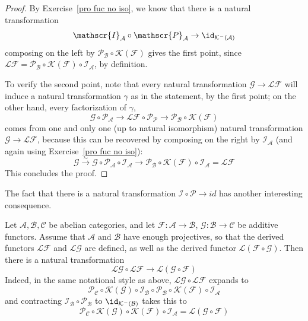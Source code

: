 \begin{proof}
By Exercise~\ref{pro fuc no iso}, we know that there is a natural transformation
\[\mathscr{I}_{\mathcal{A}}\circ\mathscr{P}_{\mathcal{A}}\to \id_{\mathcal{K}^-(\mathcal{A})}\]
composing on the left by $\mathscr{P}_{\mathcal{B}}\circ\mathcal{K}(\mathscr{F})$ gives the first point, since $\mathcal{L}\mathscr{F}=\mathscr{P}_{\mathcal{B}}\circ\mathcal{K}(\mathscr{F})\circ\mathscr{I}_{\mathcal{A}}$, by definition.\par
To verify the second point, note that every natural transformation $\mathscr{G}\to\mathcal{L}\mathscr{F}$ will induce a natural transformation $\gamma$ as in the statement, by the first point; on the other hand, every factorization of $\gamma$,
\[\mathscr{G}\circ\mathscr{P}_{\mathcal{A}}\to\mathcal{L}\mathscr{F}\circ\mathscr{P}_{\mathcal{P}}\to\mathscr{P}_{\mathcal{B}}\circ\mathcal{K}(\mathscr{F})\]
comes from one and only one (up to natural isomorphism) natural transformation $\mathscr{G}\to\mathcal{L}\mathscr{F}$, because this can be recovered by composing on the right by $\mathscr{I}_{\mathcal{A}}$ (and again using Exercise~\ref{pro fuc no iso}):
\[\mathscr{G}\stackrel{\sim}{\to}\mathscr{G}\circ\mathscr{P}_{\mathcal{A}}\circ\mathscr{I}_{\mathcal{A}}\to\mathscr{P}_{\mathcal{B}}\circ\mathcal{K}(\mathscr{F})\circ\mathscr{I}_{\mathcal{A}}=\mathcal{L}\mathscr{F}\]
This concludes the proof.
\end{proof}
\begin{remark}
The fact that there is a natural transformation $\mathscr{I}\circ\mathscr{P}\to id$ has another interesting consequence.\par
Let $\mathcal{A},\mathcal{B},\mathcal{C}$ be abelian categories, and let $\mathscr{F}:\mathcal{A}\to\mathcal{B}$, $\mathscr{G}:\mathcal{B}\to\mathcal{C}$ be additive functors. Assume that $\mathcal{A}$ and $\mathcal{B}$ have enough projectives, so that the derived functors $\mathcal{L}\mathscr{F}$ and $\mathcal{L}\mathscr{G}$ are defined, as well as the derived functor $\mathcal{L}(\mathscr{F}\circ\mathscr{G})$. Then there is a natural transformation
\[\mathcal{L}\mathscr{G}\circ\mathcal{L}\mathscr{F}\to\mathcal{L}(\mathscr{G}\circ\mathscr{F})\]
Indeed, in the same notational style as above, $\mathcal{L}\mathscr{G}\circ\mathcal{L}\mathscr{F}$ expands to
\[\mathscr{P}_{\mathcal{C}}\circ\mathcal{K}(\mathscr{G})\circ\mathscr{I}_{\mathcal{B}}\circ\mathscr{P}_{\mathcal{B}}\circ\mathcal{K}(\mathscr{F})\circ\mathscr{I}_{\mathcal{A}}\]
and contracting $\mathscr{I}_{\mathcal{B}}\circ\mathscr{P}_{\mathcal{B}}$ to $\id_{\mathcal{K}^-(\mathcal{B})}$ takes this to
\[\mathscr{P}_{\mathcal{C}}\circ\mathcal{K}(\mathscr{G})\circ\mathcal{K}(\mathscr{F})\circ\mathscr{I}_{\mathcal{A}}=\mathcal{L}(\mathscr{G}\circ\mathscr{F})\]
\end{remark}
